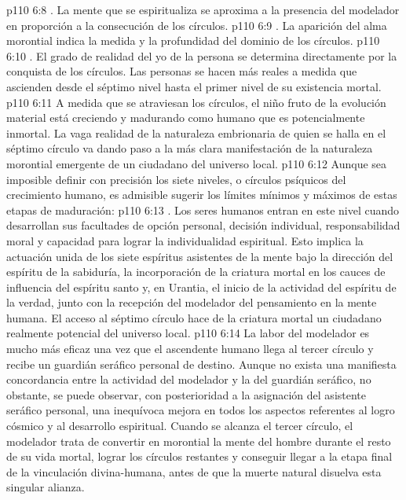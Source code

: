 \vs p110 6:8 . La mente que se espiritualiza se aproxima a la presencia del modelador en proporción a la consecución de los círculos.
\vs p110 6:9 . La aparición del alma morontial indica la medida y la profundidad del dominio de los círculos.
\vs p110 6:10 . El grado de realidad del yo de la persona se determina directamente por la conquista de los círculos. Las personas se hacen más reales a medida que ascienden desde el séptimo nivel hasta el primer nivel de su existencia mortal.
\vs p110 6:11 \pc A medida que se atraviesan los círculos, el niño fruto de la evolución material está creciendo y madurando como humano que es potencialmente inmortal. La vaga realidad de la naturaleza embrionaria de quien se halla en el séptimo círculo va dando paso a la más clara manifestación de la naturaleza morontial emergente de un ciudadano del universo local.
\vs p110 6:12 Aunque sea imposible definir con precisión los siete niveles, o círculos psíquicos del crecimiento humano, es admisible sugerir los límites mínimos y máximos de estas etapas de maduración:
\vs p110 6:13 \pc {}. Los seres humanos entran en este nivel cuando desarrollan sus facultades de opción personal, decisión individual, responsabilidad moral y capacidad para lograr la individualidad espiritual. Esto implica la actuación unida de los siete espíritus asistentes de la mente bajo la dirección del espíritu de la sabiduría, la incorporación de la criatura mortal en los cauces de influencia del espíritu santo y, en Urantia, el inicio de la actividad del espíritu de la verdad, junto con la recepción del modelador del pensamiento en la mente humana. El acceso al séptimo círculo hace de la criatura mortal un ciudadano realmente potencial del universo local.
\vs p110 6:14 \pc {} La labor del modelador es mucho más eficaz una vez que el ascendente humano llega al tercer círculo y recibe un guardián seráfico personal de destino. Aunque no exista una manifiesta concordancia entre la actividad del modelador y la del guardián seráfico, no obstante, se puede observar, con posterioridad a la asignación del asistente seráfico personal, una inequívoca mejora en todos los aspectos referentes al logro cósmico y al desarrollo espiritual. Cuando se alcanza el tercer círculo, el modelador trata de convertir en morontial la mente del hombre durante el resto de su vida mortal, lograr los círculos restantes y conseguir llegar a la etapa final de la vinculación divina\hyp{}humana, antes de que la muerte natural disuelva esta singular alianza.
